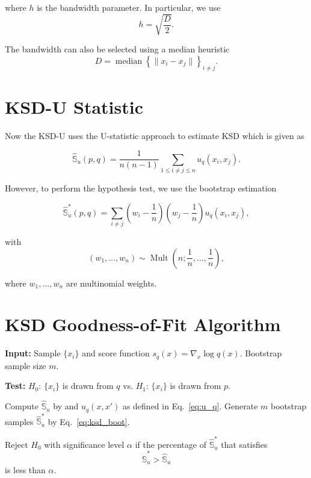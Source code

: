 \documentclass[12pt,a4paper]{report}
\begin{document}
\noindent
where $h$ is the bandwidth parameter. In particular, we use
\begin{equation}
    h = \sqrt{\frac{D}{2}}.
\end{equation}

\noindent
The bandwidth can also be selected using a median heuristic \cite{garreau2018largesampleanalysismedian}
\begin{equation}
    {D} =
    \operatorname{median}
    \left\{
        \|{x}_i-{x}_j\|
    \right\}_{i\neq j}.
\end{equation}

\section{KSD-U Statistic}
Now the KSD-U uses the U-statistic approach to estimate KSD which is given as 

\begin{equation}
\widehat{\mathbb{S}}_u(p,q)
=
\frac{1}{n(n-1)}
\sum_{1\leq i\neq j\leq n}
u_q(x_i,x_j).
\end{equation}

\noindent
However, to perform the hypothesis test,
we use the bootstrap estimation

\begin{equation}
\widehat{\mathbb{S}}_u^*(p,q)
=
\sum_{i\neq j}
\left(w_i-\frac{1}{n}\right)
\left(w_j-\frac{1}{n}\right)
u_q(x_i,x_j),
\label{eq:ksd_boot}
\end{equation}

\noindent
with
\begin{equation}
(w_1,\ldots,w_n)
\sim
\operatorname{Mult}
\left(
n;\frac{1}{n},\ldots,\frac{1}{n}
\right),
\end{equation}

\noindent
where $w_1,\ldots,w_n$ are multinomial weights.

\section{KSD Goodness-of-Fit Algorithm}
\begin{algorithm}
\caption{KSD-U bootstrap Goodness-of-fit test\cite{liu2016kernelizedsteindiscrepancygoodnessoffit}}

\textbf{Input:} Sample $\{x_i\}$ and score function
$s_q(x) = \nabla_x \log q(x)$. Bootstrap sample size $m$.

\textbf{Test:} $H_0$: $\{x_i\}$ is drawn from $q$ vs.
$H_1$: $\{x_i\}$ is drawn from $p$.

\begin{algorithmic}[1]

\STATE Compute $\widehat{\mathbb{S}}_u$ by  and
$u_q(x,x')$ as defined in Eq.~\eqref{eq:u_q}.
Generate $m$ bootstrap samples $\widehat{\mathbb{S}}_u^*$
by Eq.~\eqref{eq:ksd_boot}.

\STATE Reject $H_0$ with significance level $\alpha$ if the
percentage of $\widehat{\mathbb{S}}_u^*$ that satisfies
\[
\widehat{\mathbb{S}}_u^* > \widehat{\mathbb{S}}_u
\]
is less than $\alpha$.
\end{algorithmic}
\end{algorithm}
\end{document}
